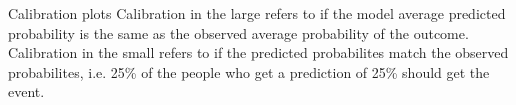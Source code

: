 \documentclass{beamer}\usepackage{listings}
\begin{document}
\begin{frame}[label={sec:org6b48336}]{Calibration plots}
Calibration in the large refers to if the model average predicted probability is the same as the observed average probability of the outcome.
\newline
Calibration in the small refers to if the predicted probabilites match the observed probabilites, i.e. 25\% of the people who get a prediction of 25\% should get the event. 
\end{frame}
\end{document}
